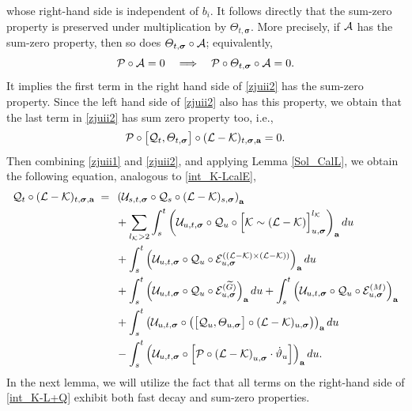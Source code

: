 \documentclass[10pt,reqno]{article}
\theoremstyle{plain} %
\theoremstyle{remark}
\numberwithin{equation}{section}
\begin{document}
whose right-hand side is independent of \(b_i\). It follows directly that the
sum-zero property is preserved under multiplication by
\(\varTheta_{t,\boldsymbol{\sigma}}\). More precisely, if \({\cal A}\) has the
sum-zero property, then so does
\(\varTheta_{t,\boldsymbol{\sigma}}\circ{\cal A}\); equivalently,
\[
{\cal P}\circ{\cal A}=0
\quad\Longrightarrow\quad
{\cal P}\circ\varTheta_{t,\boldsymbol{\sigma}}\circ{\cal A}=0.
\]
It implies the first term in the right hand side of \eqref{zjuii2} has the sum-zero property. Since the left hand side of \eqref{zjuii2} also has this property, we obtain that the last term in \eqref{zjuii2} has sum zero property too, i.e., 
\begin{align}\label{pqthlk}
   {\cal P}\circ \big[{\cal Q}_t , \varTheta_{t,\boldsymbol{\sigma}} \big]\circ (\mathcal{L} - \mathcal{K}) _{t, \boldsymbol{\sigma}, \textbf{a}}=0. 
\end{align}
Then combining \eqref{zjuii1} and \eqref{zjuii2}, and applying Lemma \ref{Sol_CalL}, we obtain the following equation, analogous to \eqref{int_K-LcalE}, 
 \begin{align}\label{int_K-L+Q}
  {\cal Q}_t\circ   (\mathcal{L} - \mathcal{K})_{t, \boldsymbol{\sigma}, \textbf{a}} \;=\; \; &
    \left(\mathcal{U}_{s, t, \boldsymbol{\sigma}} \circ  {\cal Q}_s\circ (\mathcal{L} - \mathcal{K})_{s, \boldsymbol{\sigma}}\right)_{\textbf{a}} \nonumber \\
    &+ \sum_{l_\mathcal{K} > 2} \int_{s}^t \left(\mathcal{U}_{u, t, \boldsymbol{\sigma}} \circ  {\cal Q}_u\circ \Big[\mathcal{K} \sim (\mathcal{L} - \mathcal{K})\Big]^{l_\mathcal{K}}_{u, \boldsymbol{\sigma}}\right)_{\textbf{a}} du \nonumber \\
    &+ \int_{s}^t \left(\mathcal{U}_{u, t, \boldsymbol{\sigma}} \circ  {\cal Q}_u\circ \mathcal{E}^{((\mathcal{L} - \mathcal{K}) \times (\mathcal{L} - \mathcal{K}))}_{u, \boldsymbol{\sigma}}\right)_{\textbf{a}} du \nonumber \\
    &+ \int_{s}^t \left(\mathcal{U}_{u, t, \boldsymbol{\sigma}} \circ  {\cal Q}_u\circ \mathcal{E}^{(\widetilde{G})}_{u, \boldsymbol{\sigma}}\right)_{\textbf{a}} du + \int_{s}^t \left(\mathcal{U}_{u, t, \boldsymbol{\sigma}} \circ  {\cal Q}_u\circ \mathcal{E}^{(M)}_{u, \boldsymbol{\sigma}}\right)_{\textbf{a}} 
    \nonumber \\
     &+ \int_{s}^t 
     \left(\mathcal{U}_{u, t, \boldsymbol{\sigma}} 
     \circ \left( \big[{\cal Q}_u , \varTheta_{u,\boldsymbol{\sigma}} \big]\circ (\mathcal{L} - \mathcal{K}) _{u, \boldsymbol{\sigma} }\right) \right)_{\textbf{a}} du
        \\\nonumber
    & - \int_{s}^t 
     \left(\mathcal{U}_{u, t, \boldsymbol{\sigma}} 
     \circ \left[ {\cal P} \circ
      \left(\mathcal{L} - \mathcal{K}\right)_{u, \boldsymbol{\sigma}}
        \cdot \dot \vartheta_{u } \right]\right)_{\textbf{a}} du.
\end{align}
In the next lemma, we will utilize the fact that all terms on the right-hand side of \eqref{int_K-L+Q} exhibit both fast decay and sum-zero properties.
\end{document}
